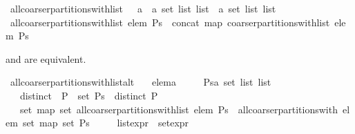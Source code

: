 \begin{isabellebody}
\isamarkupfalse%
\ all{\isacharunderscore}coarser{\isacharunderscore}partitions{\isacharunderscore}with{\isacharunderscore}list\ {\isacharcolon}{\isacharcolon}\ {\isachardoublequoteopen}\ {\isacharprime}a\ {\isasymRightarrow}\ {\isacharprime}a\ set\ list\ list\ {\isasymRightarrow}\ {\isacharprime}a\ set\ list\ list{\isachardoublequoteclose}\isanewline
{}\ {\isachardoublequoteopen}all{\isacharunderscore}coarser{\isacharunderscore}partitions{\isacharunderscore}with{\isacharunderscore}list\ elem\ Ps\ {\isacharequal}\ concat\ {\isacharparenleft}map\ {\isacharparenleft}coarser{\isacharunderscore}partitions{\isacharunderscore}with{\isacharunderscore}list\ elem{\isacharparenright}\ Ps{\isacharparenright}{\isachardoublequoteclose}%
\begin{isamarkuptext}%
 and  are equivalent.%
\end{isamarkuptext}%
\isamarkuptrue%
\isamarkupfalse%
\ all{\isacharunderscore}coarser{\isacharunderscore}partitions{\isacharunderscore}with{\isacharunderscore}list{\isacharunderscore}alt{\isacharcolon}\isanewline
\ \ \ elem{\isacharcolon}{\isacharcolon}{\isacharprime}a\isanewline
\ \ \ \ \ Ps{\isacharcolon}{\isacharcolon}{\isachardoublequoteopen}{\isacharprime}a\ set\ list\ list{\isachardoublequoteclose}\isanewline
\ \ \ distinct{\isacharcolon}\ {\isachardoublequoteopen}{\isasymforall}\ P\ {\isasymin}\ set\ Ps\ {\isachardot}\ distinct\ P{\isachardoublequoteclose}\isanewline
\ \ \ {\isachardoublequoteopen}set\ {\isacharparenleft}map\ set\ {\isacharparenleft}all{\isacharunderscore}coarser{\isacharunderscore}partitions{\isacharunderscore}with{\isacharunderscore}list\ elem\ Ps{\isacharparenright}{\isacharparenright}\ {\isacharequal}\ all{\isacharunderscore}coarser{\isacharunderscore}partitions{\isacharunderscore}with\ elem\ {\isacharparenleft}set\ {\isacharparenleft}map\ set\ Ps{\isacharparenright}{\isacharparenright}{\isachardoublequoteclose}\isanewline
\ \ \ \ {\isacharparenleft}\ {\isachardoublequoteopen}{\isacharquery}list{\isacharunderscore}expr\ {\isacharequal}\ {\isacharquery}set{\isacharunderscore}expr{\isachardoublequoteclose}{\isacharparenright}\isanewline
%
\isadelimproof
%
\endisadelimproof
%
\isatagproof
{}\isamarkupfalse%
\ {\isacharminus}\isanewline

\end{isabellebody}

